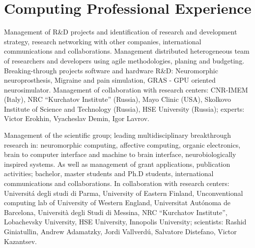 \documentclass{moderncv}
\begin{document}
\section{Computing Professional Experience}

        {Management of R\&D projects and identification of research and development strategy, research networking with other companies, international communications and collaborations. Management distributed heterogeneous team of researchers and developers using agile methodologies, planing and budgeting.
          Breaking-through projects software and hardware R\&D: Neuromorphic neuroprosthesis, Migraine and pain simulation, GRAS - GPU oriented neurosimulator.
          Management of collaboration with research centers: CNR-IMEM (Italy), NRC ``Kurchatov Institute'' (Russia), Mayo Clinic (USA), Skolkovo Institute of Science and Technology (Russia), HSE University (Russia); experts: Victor Erokhin, Vyacheslav Demin, Igor Lavrov.}
        
        {Management of the scientific group; leading multidisciplinary breakthrough research in: neuromorphic computing, affective computing, organic electronics, brain to computer interface and machine to brain interface, neurobiologically inspired systems. As well as management of grant applications, publication activities; bachelor, master students and Ph.D students, international communications and collaborations.
          In collaboration with research centers: Universit\'{a} degli studi di Parma, University of Eastern Finland, Unconventional computing lab of University of Western England, Universitat Aut\'onoma de Barcelona, Università degli Studi di Messina,
NRC ``Kurchatov Institute'', Lobachevsky University, HSE University, Innopolis University; scientists: Rashid Giniatullin, Andrew Adamatzky, Jordi Vallverd\'{u}, Salvatore Distefano, Victor Kazantsev.}

\end{document}

